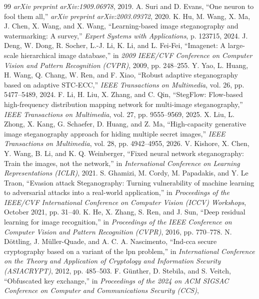 \begin{thebibliography}{99}
\emph{arXiv preprint arXiv:1909.06978}, 2019.
A. Suri and D. Evans,
``One neuron to fool them all,''
\emph{arXiv preprint arXiv:2003.09372}, 2020.
K. Hu, M. Wang, X. Ma, J. Chen, X. Wang, and X. Wang,
``Learning-based image steganography and watermarking: A survey,''
\emph{Expert Systems with Applications}, p. 123715, 2024.
J. Deng, W. Dong, R. Socher, L.-J. Li, K. Li, and L. Fei-Fei,
``Imagenet: A large-scale hierarchical image database,''
in \emph{2009 IEEE/CVF Conference on Computer Vision and Pattern Recognition (CVPR)},
2009, pp. 248--255.
Y. Yao, L. Huang, H. Wang, Q. Chang, W. Ren, and F. Xiao,
``Robust adaptive steganography based on adaptive STC-ECC,''
\emph{IEEE Transactions on Multimedia},
vol. 26, pp. 5477--5489, 2024.
F. Li, H. Liu, X. Zhang, and C. Qin,
``StegFlow: Flow-based high-frequency distribution mapping network for multi-image steganography,''
\emph{IEEE Transactions on Multimedia},
vol. 27, pp. 9555--9569, 2025.
X. Liu, L. Zhong, X. Kang, G. Schaefer, D. Huang, and Z. Ma,
``High-capacity generative image steganography approach for hiding multiple secret images,''
\emph{IEEE Transactions on Multimedia},
vol. 28, pp. 4942--4955, 2026.
V. Kishore, X. Chen, Y. Wang, B. Li, and K. Q. Weinberger,
``Fixed neural network steganography: Train the images, not the network,''
in \emph{International Conference on Learning Representations (ICLR)}, 2021.
S. Ghamizi, M. Cordy, M. Papadakis, and Y. Le Traon,
``Evasion attack Steganography: Turning vulnerability of machine learning to adversarial attacks into a real-world application,''
in \emph{Proceedings of the IEEE/CVF International Conference on Computer Vision (ICCV) Workshops},
October 2021, pp. 31--40.
K. He, X. Zhang, S. Ren, and J. Sun,
``Deep residual learning for image recognition,''
in \emph{Proceedings of the IEEE Conference on Computer Vision and Pattern Recognition (CVPR)},
2016, pp. 770--778.
N. Döttling, J. Müller-Quade, and A. C. A. Nascimento,
``Ind-cca secure cryptography based on a variant of the lpn problem,''
in \emph{International Conference on the Theory and Application of Cryptology and Information Security (ASIACRYPT)},
2012, pp. 485--503.
F. Günther, D. Stebila, and S. Veitch,
``Obfuscated key exchange,''
in \emph{Proceedings of the 2024 on ACM SIGSAC Conference on Computer and Communications Security (CCS)},

\end{thebibliography}
